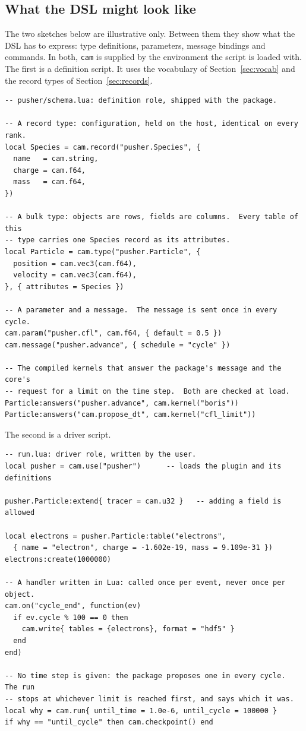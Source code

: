 \documentclass[11pt,a4paper]{article}
\newcommand{\code}[1]{\texttt{#1}}
\begin{document}
\subsection{What the DSL might look like}
\label{sec:sketch}

The two sketches below are illustrative only.  Between them they show what
the DSL has to express: type definitions, parameters, message bindings and
commands.  In both, \code{cam} is supplied by the environment the script is
loaded with.  The first is a definition script.  It uses the vocabulary of
Section~\ref{sec:vocab} and the record types of Section~\ref{sec:records}.

\begin{lstlisting}[language={[5.3]Lua}]
-- pusher/schema.lua: definition role, shipped with the package.

-- A record type: configuration, held on the host, identical on every rank.
local Species = cam.record("pusher.Species", {
  name   = cam.string,
  charge = cam.f64,
  mass   = cam.f64,
})

-- A bulk type: objects are rows, fields are columns.  Every table of this
-- type carries one Species record as its attributes.
local Particle = cam.type("pusher.Particle", {
  position = cam.vec3(cam.f64),
  velocity = cam.vec3(cam.f64),
}, { attributes = Species })

-- A parameter and a message.  The message is sent once in every cycle.
cam.param("pusher.cfl", cam.f64, { default = 0.5 })
cam.message("pusher.advance", { schedule = "cycle" })

-- The compiled kernels that answer the package's message and the core's
-- request for a limit on the time step.  Both are checked at load.
Particle:answers("pusher.advance", cam.kernel("boris"))
Particle:answers("cam.propose_dt", cam.kernel("cfl_limit"))
\end{lstlisting}

The second is a driver script.

\begin{lstlisting}[language={[5.3]Lua}]
-- run.lua: driver role, written by the user.
local pusher = cam.use("pusher")      -- loads the plugin and its definitions

pusher.Particle:extend{ tracer = cam.u32 }   -- adding a field is allowed

local electrons = pusher.Particle:table("electrons",
  { name = "electron", charge = -1.602e-19, mass = 9.109e-31 })
electrons:create(1000000)

-- A handler written in Lua: called once per event, never once per object.
cam.on("cycle_end", function(ev)
  if ev.cycle % 100 == 0 then
    cam.write{ tables = {electrons}, format = "hdf5" }
  end
end)

-- No time step is given: the package proposes one in every cycle.  The run
-- stops at whichever limit is reached first, and says which it was.
local why = cam.run{ until_time = 1.0e-6, until_cycle = 100000 }
if why == "until_cycle" then cam.checkpoint() end
\end{lstlisting}
\end{document}
